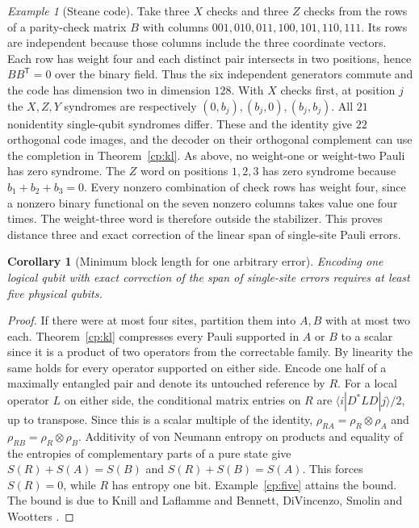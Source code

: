 \documentclass[aps,pra,onecolumn,superscriptaddress,nofootinbib,10pt]{revtex4-2}
\newtheorem{corollary}[theorem]{Corollary}
\theoremstyle{definition}
\theoremstyle{remark}
\newtheorem{example}[theorem]{Example}
\begin{document}
\begin{example}[Steane code]\label{cp:steane}
Take three $X$ checks and three $Z$ checks from the rows of a parity-check matrix $B$ with columns $001,010,011,100,101,110,111$. Its rows are independent because those columns include the three coordinate vectors. Each row has weight four and each distinct pair intersects in two positions, hence $BB^{\mathsf T}=0$ over the binary field. Thus the six independent generators commute and the code has dimension two in dimension $128$. With $X$ checks first, at position $j$ the $X,Z,Y$ syndromes are respectively $(0,b_j),(b_j,0),(b_j,b_j)$. All $21$ nonidentity single-qubit syndromes differ. These and the identity give $22$ orthogonal code images, and the decoder on their orthogonal complement can use the completion in Theorem~\ref{cp:kl}. As above, no weight-one or weight-two Pauli has zero syndrome. The $Z$ word on positions $1,2,3$ has zero syndrome because $b_1+b_2+b_3=0$. Every nonzero combination of check rows has weight four, since a nonzero binary functional on the seven nonzero columns takes value one four times. The weight-three word is therefore outside the stabilizer. This proves distance three and exact correction of the linear span of single-site Pauli errors. \cite{n5-steane-ref}
\end{example}

\begin{corollary}[Minimum block length for one arbitrary error]\label{cp:mincode}
Encoding one logical qubit with exact correction of the span of single-site errors requires at least five physical qubits.
\end{corollary}
\begin{proof}
If there were at most four sites, partition them into $A,B$ with at most two each. Theorem~\ref{cp:kl} compresses every Pauli supported in $A$ or $B$ to a scalar since it is a product of two operators from the correctable family. By linearity the same holds for every operator supported on either side. Encode one half of a maximally entangled pair and denote its untouched reference by $R$. For a local operator $L$ on either side, the conditional matrix entries on $R$ are $\langle i|D^*LD|j\rangle/2$, up to transpose. Since this is a scalar multiple of the identity, $\rho_{RA}=\rho_R\otimes\rho_A$ and $\rho_{RB}=\rho_R\otimes\rho_B$. Additivity of von Neumann entropy on products and equality of the entropies of complementary parts of a pure state give
$S(R)+S(A)=S(B)$ and $S(R)+S(B)=S(A)$. This forces $S(R)=0$, while $R$ has entropy one bit. Example~\ref{cp:five} attains the bound.
The bound is due to Knill and Laflamme \cite{n4:KL} and Bennett, DiVincenzo, Smolin and Wootters \cite{rf:Bennett1996}.
\end{proof}
\end{document}
